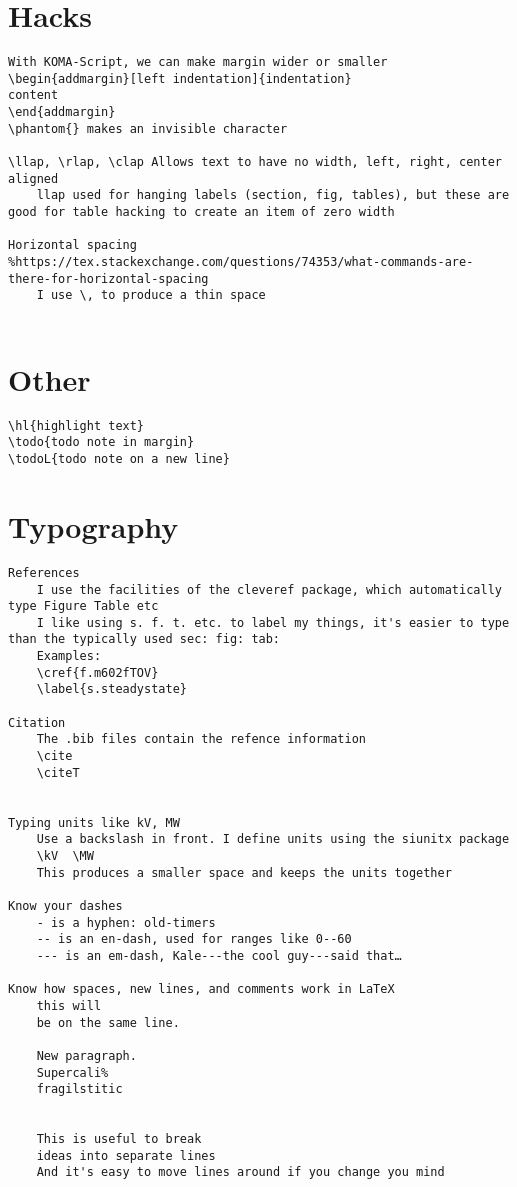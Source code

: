 \documentclass[compact]{corpboreport}
\begin{document}
\section{Hacks}

\lstset{language=tex}
\begin{lstlisting}
With KOMA-Script, we can make margin wider or smaller
\begin{addmargin}[left indentation]{indentation}
content
\end{addmargin}
\phantom{} makes an invisible character

\llap, \rlap, \clap	Allows text to have no width, left, right, center aligned
	llap used for hanging labels (section, fig, tables), but these are good for table hacking to create an item of zero width

Horizontal spacing	%https://tex.stackexchange.com/questions/74353/what-commands-are-there-for-horizontal-spacing
	I use \, to produce a thin space


\end{lstlisting}

\section{Other}

\begin{lstlisting}
\hl{highlight text}
\todo{todo note in margin}
\todoL{todo note on a new line}
\end{lstlisting}


\IntentionallyBlankPage


\section{Typography}

\begin{lstlisting}
References
	I use the facilities of the cleveref package, which automatically type Figure Table etc
	I like using s. f. t. etc. to label my things, it's easier to type than the typically used sec: fig: tab:
	Examples:
	\cref{f.m602fTOV}
	\label{s.steadystate}

Citation
	The .bib files contain the refence information
	\cite
	\citeT


Typing units like kV, MW
	Use a backslash in front. I define units using the siunitx package
	\kV  \MW
	This produces a smaller space and keeps the units together

Know your dashes
	- is a hyphen: old-timers
	-- is an en-dash, used for ranges like 0--60
	--- is an em-dash, Kale---the cool guy---said that…

Know how spaces, new lines, and comments work in LaTeX
	this will
	be on the same line.

	New paragraph.
	Supercali%
	fragilstitic


	This is useful to break
	ideas into separate lines
	And it's easy to move lines around if you change you mind
\end{lstlisting}
\end{document}
